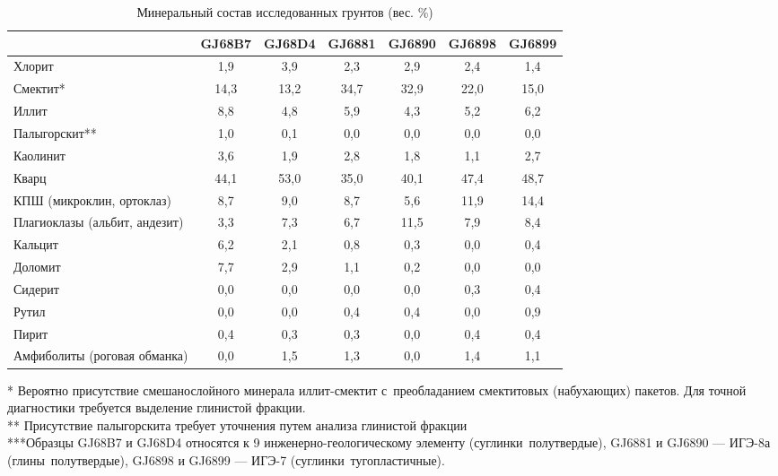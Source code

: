 \begin{table}[h!]
  \small
    \centering
  \begin{threeparttable}
  \caption{Минеральный состав исследованных грунтов (вес. \%)}
  \label{tab:mineral}
    \begin{tabular}{|l|c|c|c|c|c|c|}
        \hline
                                  & GJ68B7 & GJ68D4 & GJ6881 & GJ6890 & GJ6898 & GJ6899 \\ \hline
    Хлорит                        & 1,9  & 3,9  & 2,3  & 2,9  & 2,4  & 1,4  \\ \hline
    Смектит*                      & 14,3 & 13,2 & 34,7 & 32,9 & 22,0 & 15,0 \\ \hline
    Иллит                         & 8,8  & 4,8  & 5,9  & 4,3  & 5,2  & 6,2  \\ \hline
    Палыгорскит**                 & 1,0  & 0,1  & 0,0  & 0,0  & 0,0  & 0,0  \\ \hline
    Каолинит                      & 3,6  & 1,9  & 2,8  & 1,8  & 1,1  & 2,7  \\ \hline
    Кварц                         & 44,1 & 53,0 & 35,0 & 40,1 & 47,4 & 48,7 \\ \hline
    КПШ (микроклин, ортоклаз)     & 8,7  & 9,0  & 8,7  & 5,6  & 11,9 & 14,4 \\ \hline
    Плагиоклазы (альбит, андезит) & 3,3  & 7,3  & 6,7  & 11,5 & 7,9  & 8,4  \\ \hline
    Кальцит                       & 6,2  & 2,1  & 0,8  & 0,3  & 0,0  & 0,4  \\ \hline
    Доломит                       & 7,7  & 2,9  & 1,1  & 0,2  & 0,0  & 0,0  \\ \hline
    Сидерит                       & 0,0  & 0,0  & 0,0  & 0,0  & 0,3  & 0,4  \\ \hline
    Рутил                         & 0,0  & 0,0  & 0,4  & 0,4  & 0,0  & 0,9  \\ \hline
    Пирит                         & 0,4  & 0,3  & 0,3  & 0,0  & 0,4  & 0,4  \\ \hline
    Амфиболиты (роговая обманка)  & 0,0  & 1,5  & 1,3  & 0,0  & 1,4  & 1,1  \\ \hline
    \end{tabular}
    \raggedright 
    * Вероятно присутствие смешанослойного минерала иллит-смектит с~преобладанием смектитовых 
    (набухающих) пакетов. 
    Для точной диагностики требуется выделение глинистой фракции.
    \\
    ** Присутствие палыгорскита требует уточнения путем анализа глинистой фракции
    \\
    ***Образцы GJ68B7 и GJ68D4 относятся к 9 инженерно-геологическому 
    элементу (суглинки полутвердые), GJ6881 и GJ6890 --- ИГЭ-8а (глины полутвердые), 
    GJ6898 и GJ6899 --- ИГЭ-7 (суглинки тугопластичные).
    \end{threeparttable}
    \end{table}

